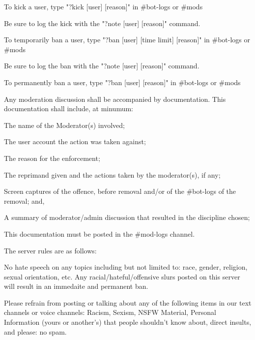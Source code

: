 \begin{longenum}[ label*=\thesubsection.\arabic*., align=left]
\begin{longenum}[label*=\arabic*., align=left]
\begin{longenum}[label*=\arabic*., align=left]
\begin{longenum}[label*=\arabic*., align=left]
			\end{longenum}
		\item To kick a user, type "?kick [user] [reason]" in \#bot-logs or \#mods
			\begin{longenum}[label*=\arabic*., align=left]
			\item Be sure to log the kick with the "?note [user] [reason]" command.
			\end{longenum}
		\item To temporarily ban a user, type "?ban [user] [time limit] [reason]" in \#bot-logs or \#mods
			\begin{longenum}[label*=\arabic*., align=left]
			\item Be sure to log the ban with the "?note [user] [reason]" command.
			\end{longenum}
		\item To permanently ban a user, type "?ban [user] [reason]" in \#bot-logs or \#mods
		\end{longenum}
	\item Any moderation discussion shall be accompanied by documentation. This documentation shall include, at minumum:
		\begin{longenum}[label*=\arabic*., align=left]
		\item The name of the Moderator(s) involved;
		\item The user account the action was taken against;
		\item The reason for the enforcement;
		\item The reprimand given and the actions taken by the moderator(s), if any;
		\item Screen captures of the offence, before removal and/or of the \#bot-logs of the removal; and,
		\item A summary of moderator/admin discussion that resulted in the discipline chosen;
		\item This documentation must be posted in the \#mod-logs channel.
		\end{longenum}
	\end{longenum}
\item The server rules are as follows:
	\begin{longenum}[label*=\arabic*., align=left]
	\item No hate speech on any topics including but not limited to: race, gender, religion, sexual orientation, etc. Any racial/hateful/offensive slurs posted on this server will result in an immedaite and permanent ban.
	\item Please refrain from posting or talking about any of the following items in our text channels or voice channels: Racism, Sexism, NSFW Material, Personal Information (yours or another's) that people shouldn't know about, direct insults, and please: no spam.

\end{longenum}
\end{longenum}
